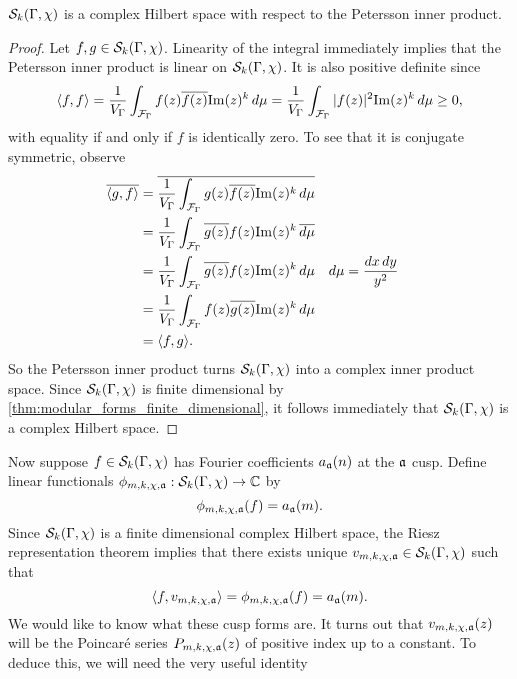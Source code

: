     \begin{proposition}\label{prop:Petersson_inner_product_hermitian_holomorphic}
      $\mathcal{S}_{k}(\Gamma,\chi)$ is a complex Hilbert space with respect to the Petersson inner product.
    \end{proposition}
    \begin{proof}
      Let $f,g \in \mathcal{S}_{k}(\Gamma,\chi)$. Linearity of the integral immediately implies that the Petersson inner product is linear on $\mathcal{S}_{k}(\Gamma,\chi)$. It is also positive definite since
      \[
        \langle f,f\rangle = \frac{1}{V_{\Gamma}}\int_{\mathcal{F}_{\Gamma}}f(z)\overline{f(z)}\mathrm{Im}(z)^{k}\,d\mu = \frac{1}{V_{\Gamma}}\int_{\mathcal{F}_{\Gamma}}|f(z)|^{2}\mathrm{Im}(z)^{k}\,d\mu \ge 0,
      \]
      with equality if and only if $f$ is identically zero. To see that it is conjugate symmetric, observe
      \begin{align*}
        \overline{\langle g,f\rangle} &= \overline{\frac{1}{V_{\Gamma}}\int_{\mathcal{F}_{\Gamma}}g(z)\overline{f(z)}\mathrm{Im}(z)^{k}\,d\mu} \\
        &= \frac{1}{V_{\Gamma}}\int_{\mathcal{F}_{\Gamma}}\overline{g(z)}f(z)\mathrm{Im}(z)^{k}\,\overline{d\mu} \\
        &= \frac{1}{V_{\Gamma}}\int_{\mathcal{F}_{\Gamma}}\overline{g(z)}f(z)\mathrm{Im}(z)^{k}\,d\mu && \text{$d\mu = \frac{dx\,dy}{y^{2}}$} \\
        &= \frac{1}{V_{\Gamma}}\int_{\mathcal{F}_{\Gamma}}f(z)\overline{g(z)}\mathrm{Im}(z)^{k}\,d\mu \\
        &= \langle f,g\rangle.
      \end{align*}
      So the Petersson inner product turns $\mathcal{S}_{k}(\Gamma,\chi)$ into a complex inner product space. Since $\mathcal{S}_{k}(\Gamma,\chi)$ is finite dimensional by \cref{thm:modular_forms_finite_dimensional}, it follows immediately that $\mathcal{S}_{k}(\Gamma,\chi)$ is a complex Hilbert space.
    \end{proof}

    Now suppose $f \in \mathcal{S}_{k}(\Gamma,\chi)$ has Fourier coefficients $a_{\mathfrak{a}}(n)$ at the $\mathfrak{a}$ cusp. Define linear functionals $\phi_{m,k,\chi,\mathfrak{a}}:\mathcal{S}_{k}(\Gamma,\chi) \to \mathbb{C}$ by 
    \[
      \phi_{m,k,\chi,\mathfrak{a}}(f) = a_{\mathfrak{a}}(m).
    \]
    Since $\mathcal{S}_{k}(\Gamma,\chi)$ is a finite dimensional complex Hilbert space, the Riesz representation theorem implies that there exists unique $v_{m,k,\chi,\mathfrak{a}} \in \mathcal{S}_{k}(\Gamma,\chi)$ such that
    \[
      \langle f,v_{m,k,\chi,\mathfrak{a}}\rangle = \phi_{m,k,\chi,\mathfrak{a}}(f) = a_{\mathfrak{a}}(m).
    \]
    We would like to know what these cusp forms are. It turns out that $v_{m,k,\chi,\mathfrak{a}}(z)$ will be the Poincar\'e series $P_{m,k,\chi,\mathfrak{a}}(z)$ of positive index up to a constant. To deduce this, we will need the very useful identity

